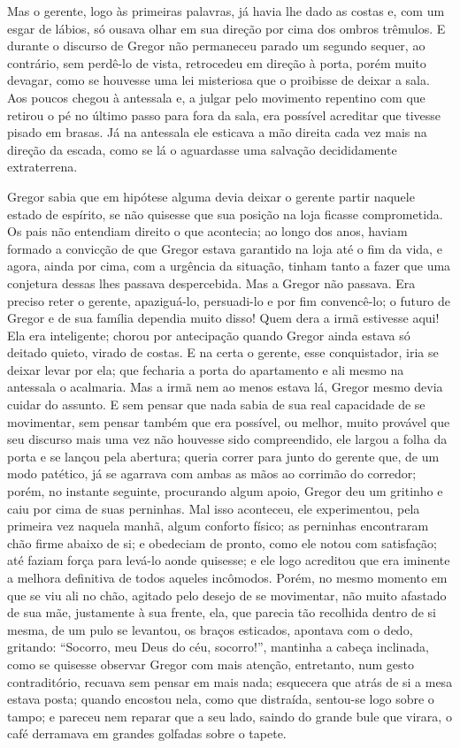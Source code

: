 Mas o gerente, logo às primeiras palavras, já havia lhe dado as costas e,
com um esgar de lábios, só ousava olhar em sua direção por cima dos ombros
trêmulos. E durante o discurso de Gregor não permaneceu parado um segundo
sequer, ao contrário, sem perdê-lo de vista, retrocedeu em direção à
porta, porém muito devagar, como se houvesse uma lei misteriosa que o
proibisse de deixar a sala. Aos poucos chegou à antessala e, a julgar pelo
movimento repentino com que retirou o pé no último passo para fora da
sala, era possível acreditar que tivesse pisado em brasas. Já na
antessala ele esticava a mão direita cada vez mais na direção da escada,
como se lá o aguardasse uma salvação decididamente extraterrena.

Gregor sabia que em hipótese alguma devia deixar o gerente partir naquele
estado de espírito, se não quisesse que sua posição na loja ficasse
comprometida. Os pais não entendiam direito o que acontecia; ao longo dos
anos, haviam formado a convicção de que Gregor estava garantido na loja
até o fim da vida, e agora, ainda por cima, com a urgência da situação,
tinham tanto a fazer que uma conjetura dessas lhes passava despercebida.
Mas a Gregor não passava. Era preciso reter o gerente, apaziguá-lo,
persuadi-lo e por fim convencê-lo; o futuro de Gregor e de sua família
dependia muito disso! Quem dera a irmã estivesse aqui! Ela era
inteligente; chorou por antecipação quando Gregor ainda estava só deitado
quieto, virado de costas. E na certa o gerente, esse conquistador, iria se
deixar levar por ela; que fecharia a porta do apartamento e ali mesmo na
antessala o acalmaria. Mas a irmã nem ao menos estava lá, Gregor mesmo
devia cuidar do assunto. E sem pensar que nada sabia de sua real
capacidade de se movimentar, sem pensar também que era possível, ou
melhor, muito provável que seu discurso mais uma vez não houvesse sido
compreendido, ele largou a folha da porta e se lançou pela abertura;
queria correr para junto do gerente que, de um modo patético, já se
agarrava com ambas as mãos ao corrimão do corredor; porém, no instante
seguinte, procurando algum apoio, Gregor deu um gritinho e caiu por cima
de suas perninhas. Mal isso aconteceu, ele experimentou, pela primeira vez
naquela manhã, algum conforto físico; as perninhas encontraram chão firme
abaixo de si; e obedeciam de pronto, como ele notou com satisfação; até
faziam força para levá-lo aonde quisesse; e ele logo acreditou que era
iminente a melhora definitiva de todos aqueles incômodos. Porém, no mesmo
momento em que se viu ali no chão, agitado pelo desejo de se movimentar,
não muito afastado de sua mãe, justamente à sua frente, ela, que parecia
tão recolhida dentro de si mesma, de um pulo se levantou, os braços
esticados, apontava com o dedo, gritando: “Socorro, meu Deus do céu,
socorro!”, mantinha a cabeça inclinada, como se quisesse observar Gregor
com mais atenção, entretanto, num gesto contraditório, recuava sem pensar em
mais nada; esquecera que atrás de si a mesa estava posta; quando encostou
nela, como que distraída, sentou-se logo sobre o tampo; e pareceu nem
reparar que a seu lado, saindo do grande bule que virara, o café derramava
em grandes golfadas sobre o tapete.

